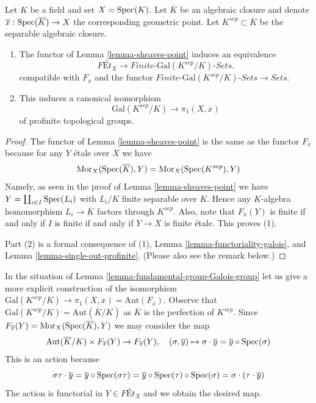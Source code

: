 \begin{lemma}
\label{lemma-fundamental-group-Galois-group}
Let $K$ be a field and set $X = \mathop{\mathrm{Spec}}(K)$. Let $\overline{K}$ be an
algebraic closure and denote $\overline{x} : \mathop{\mathrm{Spec}}(\overline{K}) \to X$
the corresponding geometric point. Let $K^{sep} \subset \overline{K}$
be the separable algebraic closure.
\begin{enumerate}
\item The functor of Lemma \ref{lemma-sheaves-point} induces an equivalence
$$
\textit{F\'Et}_X \longrightarrow
\textit{Finite-}\text{Gal}(K^{sep}/K)\textit{-Sets}.
$$
compatible with $F_{\overline{x}}$ and the functor
$\textit{Finite-}\text{Gal}(K^{sep}/K)\textit{-Sets} \to \textit{Sets}$.
\item This induces a canonical isomorphism
$$
\text{Gal}(K^{sep}/K) \longrightarrow \pi_1(X, \overline{x})
$$
of profinite topological groups.
\end{enumerate}
\end{lemma}

\begin{proof}
The functor of Lemma \ref{lemma-sheaves-point} is the same as the functor
$F_{\overline{x}}$ because for any $Y$ \'etale over $X$ we have
$$
\mathop{\mathrm{Mor}}\nolimits_X(\mathop{\mathrm{Spec}}(\overline{K}), Y) = \mathop{\mathrm{Mor}}\nolimits_X(\mathop{\mathrm{Spec}}(K^{sep}), Y)
$$
Namely, as seen in the proof of Lemma \ref{lemma-sheaves-point} we have
$Y = \coprod_{i \in I} \mathop{\mathrm{Spec}}(L_i)$ with $L_i/K$ finite separable over $K$.
Hence any $K$-algebra homomorphism $L_i \to \overline{K}$ factors
through $K^{sep}$. Also, note that $F_{\overline{x}}(Y)$ is finite
if and only if $I$ is finite if and only if $Y \to X$ is finite \'etale.
This proves (1).

\medskip\noindent
Part (2) is a formal consequence of (1),
Lemma \ref{lemma-functoriality-galois}, and
Lemma \ref{lemma-single-out-profinite}.
(Please also see the remark below.)
\end{proof}

\begin{remark}
\label{remark-variance}
In the situation of Lemma \ref{lemma-fundamental-group-Galois-group}
let us give a more explicit construction of the isomorphism
$\text{Gal}(K^{sep}/K) \to
\pi_1(X, \overline{x}) = \text{Aut}(F_{\overline{x}})$.
Observe that
$\text{Gal}(K^{sep}/K) = \text{Aut}(\overline{K}/K)$
as $\overline{K}$ is the perfection of $K^{sep}$.
Since $F_{\overline{x}}(Y) = \mathop{\mathrm{Mor}}\nolimits_X(\mathop{\mathrm{Spec}}(\overline{K}), Y)$
we may consider the map
$$
\text{Aut}(\overline{K}/K) \times F_{\overline{x}}(Y) \to F_{\overline{x}}(Y),
\quad
(\sigma, \overline{y}) \mapsto
\sigma \cdot \overline{y} = \overline{y} \circ \mathop{\mathrm{Spec}}(\sigma)
$$
This is an action because
$$
\sigma\tau \cdot \overline{y} =
\overline{y} \circ \mathop{\mathrm{Spec}}(\sigma\tau) =
\overline{y} \circ \mathop{\mathrm{Spec}}(\tau) \circ \mathop{\mathrm{Spec}}(\sigma) =
\sigma \cdot (\tau \cdot \overline{y})
$$
The action is functorial in $Y \in \textit{F\'Et}_X$ and we
obtain the desired map.
\end{remark}





